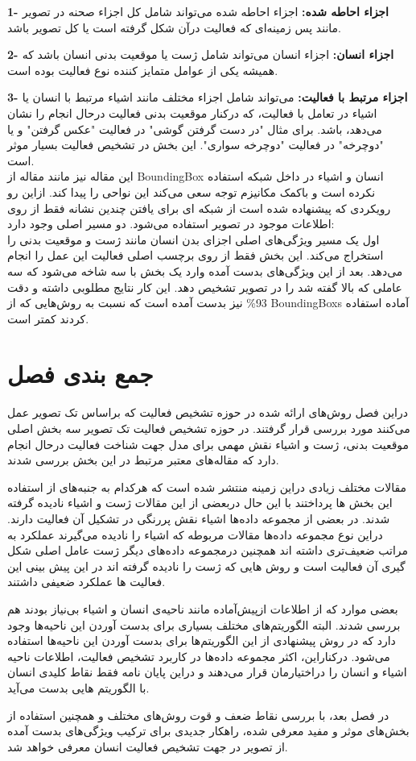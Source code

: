 \textbf{1- اجزاء احاطه شده:}
اجزاء احاطه شده می‌تواند شامل کل اجزاء صحنه در تصویر مانند پس زمینه‌ای که فعالیت درآن شکل گرفته است یا کل تصویر باشد.
 
 \textbf{2- اجزاء انسان:}
 اجزاء انسان می‌تواند شامل ژست یا موقعیت بدنی انسان باشد که همیشه یکی از عوامل متمایز کننده نوع فعالیت بوده است.
 
 \textbf{3- اجزاء مرتبط با فعالیت:}
می‌تواند شامل اجزاء مختلف مانند اشیاء مرتبط با انسان یا اشیاء در تعامل با فعالیت،‌ که درکنار موقعیت بدنی فعالیت درحال انجام را نشان می‌دهد، باشد. برای مثال "در دست گرفتن گوشی" در فعالیت "عکس گرفتن"  و یا "دوچرخه" در فعالیت "دوچرخه سواری". این بخش در تشخیص فعالیت بسیار موثر است.\\
این مقاله نیز مانند مقاله %
\cite{action_multi_att_weakly}
از %
\gls{BoundingBox}
 انسان و اشیاء در داخل شبکه استفاده نکرده است و باکمک مکانیزم توجه سعی می‌کند این نواحی را پیدا کند. ازاین رو رویکردی که پیشنهاده شده است از شبکه ای برای یافتن چندین نشانه فقط از روی اطلاعات موجود در تصویر استفاده ‌می‌شود. دو مسیر اصلی وجود دارد:\\
اول یک مسیر ویژگی‌های اصلی اجزای بدن انسان مانند ژست و موقعیت بدنی را استخراج می‌کند. این بخش فقط از روی برچسب اصلی فعالیت این عمل را انجام ‌می‌دهد. بعد از این ویژگی‌های بدست آمده وارد یک بخش با سه شاخه می‌شود که سه عاملی که بالا گفته شد را در تصویر تشخیص دهد. این کار نتایج مطلوبی داشته و دقت 93\% نیز بدست آمده است که نسبت به روش‌هایی که از %
\glspl{BoundingBox}
 آماده استفاده کردند کمتر است.
\section{جمع بندی فصل}

دراین فصل روش‌های ارائه شده در حوزه تشخیص فعالیت که براساس تک تصویر عمل ‌می‌کنند مورد بررسی قرار گرفتند. در حوزه تشخیص فعالیت تک تصویر سه بخش اصلی موقعیت بدنی، ژست و اشیاء نقش مهمی برای مدل جهت شناخت فعالیت درحال انجام دارد که مقاله‌های معتبر مرتبط در این بخش بررسی شدند.

مقالات مختلف زیادی دراین زمینه منتشر شده است که هرکدام به جنبه‌های از استفاده این بخش ها پرداختند با این حال دربعضی از این مقالات ژست و اشیاء نادیده گرفته شدند. در بعضی از مجموعه داده‌ها اشیاء نقش پررنگی در تشکیل آن فعالیت دارند. دراین نوع مجموعه داده‌ها مقالات مربوطه که اشیاء را نادیده می‌گیرند عملکرد به مراتب ضعیف‌تری داشته اند همچنین درمجموعه داده‌های دیگر ژست عامل اصلی شکل گیری آن فعالیت است و روش هایی که ژست را نادیده گرفته اند در این پیش بینی این فعالیت ها عملکرد ضعیفی داشتند.

بعضی موارد که از اطلاعات ازپیش‌آماده مانند ناحیه‌ی انسان و اشیاء بی‌نیاز بودند هم بررسی شدند. البته الگوریتم‌های مختلف بسیاری برای بدست آوردن این ناحیه‌ها وجود دارد که در روش پیشنهادی از این الگوریتم‌ها برای بدست آوردن این ناحیه‌ها استفاده می‌شود. درکناراین،‌ اکثر مجموعه داده‌ها در کاربرد تشخیص فعالیت،‌ اطلاعات ناحیه اشیاء و انسان را دراختیارمان قرار می‌دهند و دراین پایان نامه فقط نقاط کلیدی انسان با الگوریتم هایی بدست می‌آید.

در فصل بعد،‌ با بررسی نقاط ضعف و قوت روش‌های مختلف و همچنین استفاده از بخش‌های موثر و مفید معرفی شده، راهکار جدیدی برای ترکیب ویژگی‌های بدست آمده از تصویر در جهت تشخیص فعالیت انسان معرفی خواهد شد.
